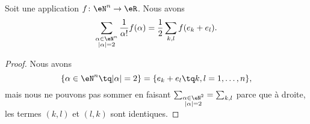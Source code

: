 \begin{lemma}			\label{LEMooBSYRooDboTor}
	Soit une application \(f \colon \eN^n\to \eR  \). Nous avons
	\begin{equation}
		\sum_{\substack{ \alpha\in\eN^n \\ | \alpha |=2 }  }\frac{1}{ \alpha!}f(\alpha)=\frac{1}{ 2}\sum_{k,l}f(e_k+e_l).
	\end{equation}
\end{lemma}

\begin{proof}
	Nous avons
	\begin{equation}
		\{ \alpha\in \eN^n\tq | \alpha |=2 \}=\{ e_k+e_l\tq k,l=1,\ldots,n \},
	\end{equation}
	mais nous ne pouvons pas sommer en faisant \( \sum_{\substack{ \alpha\in \eN^2 \\ | \alpha |=2 }  }=\sum_{k,l}\) parce que à droite, les termes \( (k,l)\) et \( (l,k)\) sont identiques.


\end{proof}
